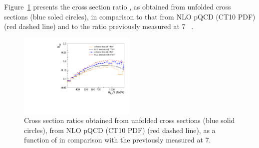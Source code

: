 Figure~\ref{fig:ratio} presents the cross section ratio \ratio, as obtained from
unfolded cross sections (blue soled circles), in comparison to that from NLO pQCD (CT10 PDF) (red dashed line) and to the ratio
previously measured at 7 \TeV~\cite{Chatrchyan:2013txa}.

\begin{figure}[!htbp]
  \begin{center}
    \includegraphics[width=0.50\textwidth]{Plots_HT_2_150/Ratio_32_unfolded_all_7TeV.pdf}
    \caption{Cross section ratios \ratio obtained from unfolded cross sections (blue solid circles), from NLO pQCD (CT10 PDF) (red dashed line), as a function of \httwo in comparison with the previously measured at 7.}
    \label{fig:ratio}
  \end{center}
\end{figure}


